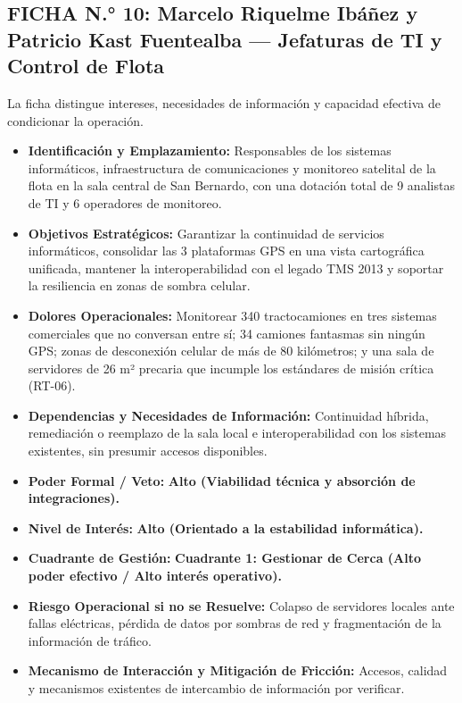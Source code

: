 \subsection*{FICHA N.° 10: Marcelo Riquelme Ibáñez y Patricio Kast Fuentealba — Jefaturas de TI y Control de Flota}
La ficha distingue intereses, necesidades de información y capacidad efectiva de condicionar la operación.
\begin{itemize}
\item \textbf{Identificación y Emplazamiento:} Responsables de los sistemas informáticos, infraestructura de comunicaciones y monitoreo satelital de la flota en la sala central de San Bernardo, con una dotación total de 9 analistas de TI y 6 operadores de monitoreo.
\item \textbf{Objetivos Estratégicos:} Garantizar la continuidad de servicios informáticos, consolidar las 3 plataformas GPS en una vista cartográfica unificada, mantener la interoperabilidad con el legado TMS 2013 y soportar la resiliencia en zonas de sombra celular.
\item \textbf{Dolores Operacionales:} Monitorear 340 tractocamiones en tres sistemas comerciales que no conversan entre sí; 34 camiones fantasmas sin ningún GPS; zonas de desconexión celular de más de 80 kilómetros; y una sala de servidores de 26 m² precaria que incumple los estándares de misión crítica (RT-06).
\item \textbf{Dependencias y Necesidades de Información:} Continuidad híbrida, remediación o reemplazo de la sala local e interoperabilidad con los sistemas existentes, sin presumir accesos disponibles.
\item \textbf{Poder Formal / Veto:} \textbf{Alto (Viabilidad técnica y absorción de integraciones).}
\item \textbf{Nivel de Interés:} \textbf{Alto (Orientado a la estabilidad informática).}
\item \textbf{Cuadrante de Gestión:} \textbf{Cuadrante 1: Gestionar de Cerca (Alto poder efectivo / Alto interés operativo).}
\item \textbf{Riesgo Operacional si no se Resuelve:} Colapso de servidores locales ante fallas eléctricas, pérdida de datos por sombras de red y fragmentación de la información de tráfico.
\item \textbf{Mecanismo de Interacción y Mitigación de Fricción:} Accesos, calidad y mecanismos existentes de intercambio de información por verificar.
\end{itemize}

